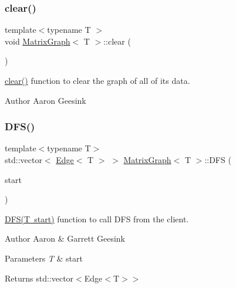 \subsubsection{\texorpdfstring{clear()}{clear()}}
{\footnotesize\ttfamily template$<$typename T $>$ \\
void \mbox{\hyperlink{class_matrix_graph}{Matrix\+Graph}}$<$ T $>$\+::clear (\begin{DoxyParamCaption}{ }\end{DoxyParamCaption})\hspace{0.3cm}{\ttfamily [inline]}}



\mbox{\hyperlink{class_matrix_graph_a3bf901c33eb9d46bee8b05f71b16a9ed}{clear()}} function to clear the graph of all of it\textquotesingle{}s data. 

\begin{DoxyAuthor}{Author}
Aaron Geesink 
\end{DoxyAuthor}
\mbox{\label{class_matrix_graph_ac6f0cc48b7826d606bd951f193ddbffb}} 
\subsubsection{\texorpdfstring{DFS()}{DFS()}}
{\footnotesize\ttfamily template$<$typename T$>$ \\
std\+::vector$<$ \mbox{\hyperlink{struct_edge}{Edge}}$<$ T $>$ $>$ \mbox{\hyperlink{class_matrix_graph}{Matrix\+Graph}}$<$ T $>$\+::D\+FS (\begin{DoxyParamCaption}\item[{T}]{start }\end{DoxyParamCaption})\hspace{0.3cm}{\ttfamily [inline]}}



\mbox{\hyperlink{class_matrix_graph_ac6f0cc48b7826d606bd951f193ddbffb}{D\+F\+S(\+T start)}} function to call D\+FS from the client. 

\begin{DoxyAuthor}{Author}
Aaron \& Garrett Geesink 
\end{DoxyAuthor}

\begin{DoxyParams}{Parameters}
{\em T} & start \\
\hline
\end{DoxyParams}
\begin{DoxyReturn}{Returns}
std\+::vector$<$Edge$<$\+T$>$$>$ 
\end{DoxyReturn}
\mbox{\label{class_matrix_graph_ab77cb8ae78964112e9af1af96614f21a}} 

